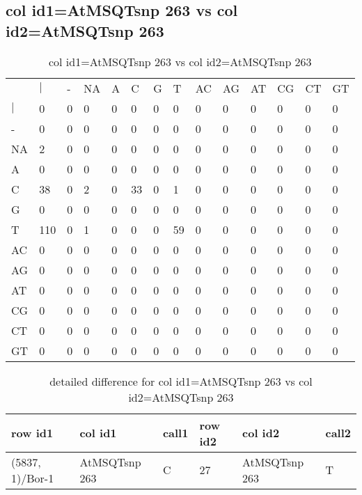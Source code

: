 \subsection{col id1=AtMSQTsnp 263 vs col id2=AtMSQTsnp 263}
\begin{center}
\begin{longtable}{|l|l|l|l|l|l|l|l|l|l|l|l|l|l|}
\caption{col id1=AtMSQTsnp 263 vs col id2=AtMSQTsnp 263} \label{table_dm614}\\
\hline
\\
\hline
&$|$&-&NA&A&C&G&T&AC&AG&AT&CG&CT&GT\\
$|$&0&0&0&0&0&0&0&0&0&0&0&0&0\\
-&0&0&0&0&0&0&0&0&0&0&0&0&0\\
NA&2&0&0&0&0&0&0&0&0&0&0&0&0\\
A&0&0&0&0&0&0&0&0&0&0&0&0&0\\
C&38&0&2&0&33&0&1&0&0&0&0&0&0\\
G&0&0&0&0&0&0&0&0&0&0&0&0&0\\
T&110&0&1&0&0&0&59&0&0&0&0&0&0\\
AC&0&0&0&0&0&0&0&0&0&0&0&0&0\\
AG&0&0&0&0&0&0&0&0&0&0&0&0&0\\
AT&0&0&0&0&0&0&0&0&0&0&0&0&0\\
CG&0&0&0&0&0&0&0&0&0&0&0&0&0\\
CT&0&0&0&0&0&0&0&0&0&0&0&0&0\\
GT&0&0&0&0&0&0&0&0&0&0&0&0&0\\
\hline
\end{longtable}
\end{center}

\begin{center}
\begin{longtable}{|l|l|l|l|l|l|}
\caption{detailed difference for col id1=AtMSQTsnp 263 vs col id2=AtMSQTsnp 263} \label{table_dm615}\\
\hline
row id1&col id1&call1&row id2&col id2&call2\\
\hline
(5837, 1)/Bor-1&AtMSQTsnp 263&C&27&AtMSQTsnp 263&T\\
\hline
\end{longtable}
\end{center}

